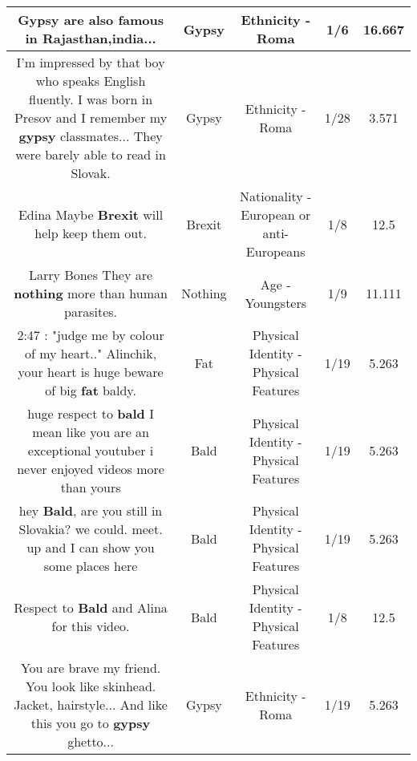 \documentclass[11pt]{article}
\newlength\mylength
\begin{document}
\begin{center}
\begin{longtable}{|C{.65\mylength}|C{.30\mylength}|C{.12\mylength}|C{.12\mylength}|C{.12\mylength}|}
  \small Gypsy are also famous in Rajasthan,india...\normalsize   & Gypsy & Ethnicity - Roma & 1/6 & 16.667 \\  \hline
  \small I'm impressed by that boy who speaks English fluently. I was born in Presov and I remember my \textbf{gypsy} classmates... They were barely able to read in Slovak.\normalsize   & Gypsy & Ethnicity - Roma & 1/28 & 3.571 \\  \hline
  \small Edina  Maybe \textbf{Brexit} will help keep them out.\normalsize   & Brexit & Nationality - European or anti-Europeans & 1/8 & 12.5 \\  \hline
  \small Larry Bones They are \textbf{nothing} more than human parasites.\normalsize   & Nothing & Age - Youngsters & 1/9 & 11.111 \\  \hline
  \small \@2:47 :  "judge me by colour of my heart.."  Alinchik, your heart is huge beware of big \textbf{fat} baldy.\normalsize   & Fat & Physical Identity - Physical Features & 1/19 & 5.263 \\  \hline
  \small huge respect to \textbf{bald} I mean like you are an exceptional youtuber i never enjoyed videos more than yours\normalsize   & Bald & Physical Identity - Physical Features & 1/19 & 5.263 \\  \hline
  \small hey \textbf{Bald}, are you still in Slovakia? we could. meet. up and I can show you some places here\normalsize   & Bald & Physical Identity - Physical Features & 1/19 & 5.263 \\  \hline
  \small Respect to \textbf{Bald} and Alina for this video.\normalsize   & Bald & Physical Identity - Physical Features & 1/8 & 12.5 \\  \hline
  \small You are brave my friend. You look like skinhead. Jacket, hairstyle... And like this you go to \textbf{gypsy} ghetto...\normalsize   & Gypsy & Ethnicity - Roma & 1/19 & 5.263 \\  \hline

\end{longtable}
\end{center}
\end{document}
